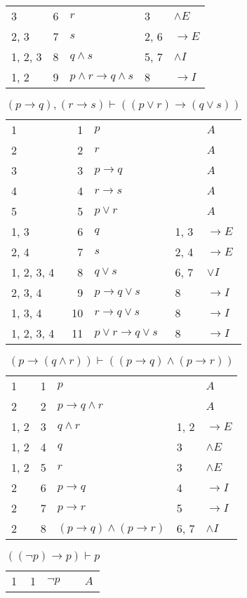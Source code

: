 \documentclass{article}
\begin{document}
\begin{table}[htbp]
\begin{tabular}{lrlll}
{3} & 6 & $r$ & {3} & $∧E$ \\
{2, 3} & 7 & $s$ & {2, 6} & $→E$ \\
{1, 2, 3} & 8 & $q∧s$ & {5, 7} & $∧I$ \\
{1, 2} & 9 & $p∧r→q∧s$ & {8} & $→I$ \\
\end{tabular}
\end{table}\begin{table}[htbp]\caption*{$(p→q),(r→s) ⊢ ((p∨r)→(q∨s))$}\centering\begin{tabular}{lrlll}
{1} & 1 & $p$ & {} & $A$ \\
{2} & 2 & $r$ & {} & $A$ \\
{3} & 3 & $p→q$ & {} & $A$ \\
{4} & 4 & $r→s$ & {} & $A$ \\
{5} & 5 & $p∨r$ & {} & $A$ \\
{1, 3} & 6 & $q$ & {1, 3} & $→E$ \\
{2, 4} & 7 & $s$ & {2, 4} & $→E$ \\
{1, 2, 3, 4} & 8 & $q∨s$ & {6, 7} & $∨I$ \\
{2, 3, 4} & 9 & $p→q∨s$ & {8} & $→I$ \\
{1, 3, 4} & 10 & $r→q∨s$ & {8} & $→I$ \\
{1, 2, 3, 4} & 11 & $p∨r→q∨s$ & {8} & $→I$ \\
\end{tabular}
\end{table}\begin{table}[htbp]\caption*{$(p→(q∧r)) ⊢ ((p→q)∧(p→r))$}\centering\begin{tabular}{lrlll}
{1} & 1 & $p$ & {} & $A$ \\
{2} & 2 & $p→q∧r$ & {} & $A$ \\
{1, 2} & 3 & $q∧r$ & {1, 2} & $→E$ \\
{1, 2} & 4 & $q$ & {3} & $∧E$ \\
{1, 2} & 5 & $r$ & {3} & $∧E$ \\
{2} & 6 & $p→q$ & {4} & $→I$ \\
{2} & 7 & $p→r$ & {5} & $→I$ \\
{2} & 8 & $(p→q)∧(p→r)$ & {6, 7} & $∧I$ \\
\end{tabular}
\end{table}\begin{table}[htbp]\caption*{$((¬p)→p) ⊢ p$}\centering\begin{tabular}{lrlll}
{1} & 1 & $¬p$ & {} & $A$ \\

\end{tabular}
\end{table}
\end{document}
